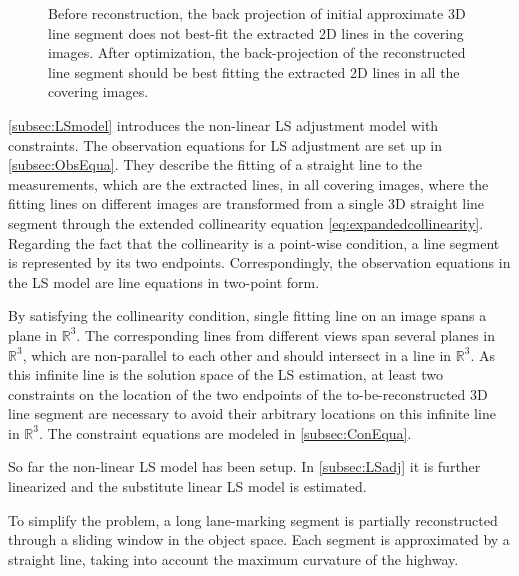 \begin{figure}
	\centering
	
	\caption{\small Before reconstruction, the back projection of initial approximate 3D line segment does not best-fit the extracted 2D lines in the covering images. After optimization, the back-projection of the reconstructed line segment should be best fitting the extracted 2D lines in all the covering images.}
	\label{fig:mainidea}
\end{figure}


\cref{subsec:LSmodel} introduces the non-linear LS adjustment model with constraints. The observation equations for LS adjustment are set up in \cref{subsec:ObsEqua}. They describe the fitting of a straight line to the measurements, which are the extracted lines, in all covering images, where the fitting lines on different images are transformed from a single 3D straight line segment through the extended collinearity equation \eqref{eq:expandedcollinearity}. Regarding the fact that the collinearity is a point-wise condition, a line segment is represented by its two endpoints. Correspondingly, the observation equations in the LS model are line equations in two-point form. 

By satisfying the collinearity condition, single fitting line on an image spans a plane in $\mathbb{R}^3$. The corresponding lines from different views span several planes in $\mathbb{R}^3$, which are non-parallel to each other and should intersect in a line in $\mathbb{R}^3$. As this infinite line is the solution space of the LS estimation, at least two constraints on the location of the two endpoints of the to-be-reconstructed 3D line segment are necessary to avoid their arbitrary locations on this infinite line in $\mathbb{R}^3$. The constraint equations are modeled in \cref{subsec:ConEqua}.

So far the non-linear LS model has been setup. In \cref{subsec:LSadj} it is further linearized and the substitute linear LS model is estimated.


To simplify the problem, a long lane-marking segment is partially reconstructed through a sliding window in the object space. Each segment is approximated by a straight line, taking into account the maximum curvature of the highway. 

